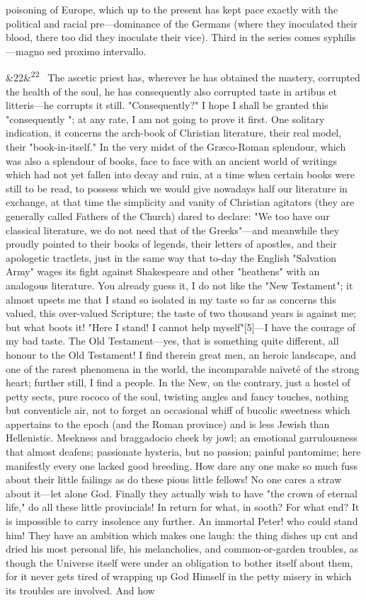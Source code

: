 \documentclass[12pt]{article}
\newcommand{\para}[1][]{\par\noindent\ifx&#1&\else\textsuperscript{\footnotesize #1}~\fi}
\begin{document}
poisoning of Europe, which up to the present has kept pace exactly with the political and racial pre---dominance of the Germans (where they inoculated their blood, there too did they inoculate their vice). Third in the series comes syphilis---magno sed proximo intervallo.

\para[22] The ascetic priest has, wherever he has obtained the mastery, corrupted the health of the soul, he has consequently also corrupted taste in artibus et litteris---he corrupts it still. "Consequently?" I hope I shall be granted this "consequently "; at any rate, I am not going to prove it first. One solitary indication, it concerns the arch-book of Christian literature, their real model, their "book-in-itself." In the very midst of the Græco-Roman splendour, which was also a splendour of books, face to face with an ancient world of writings which had not yet fallen into decay and ruin, at a time when certain books were still to be read, to possess which we would give nowadays half our literature in exchange, at that time the simplicity and vanity of Christian agitators (they are generally called Fathers of the Church) dared to declare: "We too have our classical literature, we do not need that of the Greeks"---and meanwhile they proudly pointed to their books of legends, their letters of apostles, and their apologetic tractlets, just in the same way that to-day the English "Salvation Army" wages its fight against Shakespeare and other "heathens" with an analogous literature. You already guess it, I do not like the "New Testament"; it almost upsets me that I stand so isolated in my taste so far as concerns this valued, this over-valued Scripture; the taste of two thousand years is against me; but what boots it! "Here I stand! I cannot help myself"[5]---I have the courage of my bad taste. The Old Testament---yes, that is something quite different, all honour to the Old Testament! I find therein great men, an heroic landscape, and one of the rarest phenomena in the world, the incomparable naïveté of the strong heart; further still, I find a people. In the New, on the contrary, just a hostel of petty sects, pure rococo of the soul, twisting angles and fancy touches, nothing but conventicle air, not to forget an occasional whiff of bucolic sweetness which appertains to the epoch (and the Roman province) and is less Jewish than Hellenistic. Meekness and braggadocio cheek by jowl; an emotional garrulousness that almost deafens; passionate hysteria, but no passion; painful pantomime; here manifestly every one lacked good breeding. How dare any one make so much fuss about their little failings as do these pious little fellows! No one cares a straw about it---let alone God. Finally they actually wish to have "the crown of eternal life," do all these little provincials! In return for what, in sooth? For what end? It is impossible to carry insolence any further. An immortal Peter! who could stand him! They have an ambition which makes one laugh: the thing dishes up cut and dried his most personal life, his melancholies, and common-or-garden troubles, as though the Universe itself were under an obligation to bother itself about them, for it never gets tired of wrapping up God Himself in the petty misery in which its troubles are involved. And how 
\end{document}
